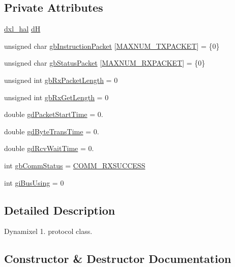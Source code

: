 \subsection*{Private Attributes}
\begin{DoxyCompactItemize}
\item 
\hyperlink{classdxl__hal}{dxl\+\_\+hal} \hyperlink{classdynamixel_ae003cc90ada6d7b70eaa4ea9d42d4deb}{d\+H}
\item 
unsigned char \hyperlink{classdynamixel_afd94dcf01b8e96298727776e222de722}{gb\+Instruction\+Packet} \mbox{[}\hyperlink{dxl__hal_8h_ad753363487043da5d9fdd3fd1071f59e}{M\+A\+X\+N\+U\+M\+\_\+\+T\+X\+P\+A\+C\+K\+E\+T}\mbox{]} = \{0\}
\item 
unsigned char \hyperlink{classdynamixel_aa57c86d3bbbeaf5c9d4f6bd00376b04f}{gb\+Status\+Packet} \mbox{[}\hyperlink{dxl__hal_8h_a37d5ce8f0a9ee058fa9674502c6a8b3a}{M\+A\+X\+N\+U\+M\+\_\+\+R\+X\+P\+A\+C\+K\+E\+T}\mbox{]} = \{0\}
\item 
unsigned int \hyperlink{classdynamixel_a333686e1b5903d16c41df8172b6bd5a8}{gb\+Rx\+Packet\+Length} = 0
\item 
unsigned int \hyperlink{classdynamixel_a9d590ce24791d111c2db9b66be1e046d}{gb\+Rx\+Get\+Length} = 0
\item 
double \hyperlink{classdynamixel_a6c6314fb7070e6fd361e57c5de17e0ec}{gd\+Packet\+Start\+Time} = 0.
\item 
double \hyperlink{classdynamixel_a2173f25c6299da7ddb37ba3d2bf1f738}{gd\+Byte\+Trans\+Time} = 0.
\item 
double \hyperlink{classdynamixel_a9f47887864517d74955a2bc787ae4456}{gd\+Rcv\+Wait\+Time} = 0.
\item 
int \hyperlink{classdynamixel_a5b603f6bed7ccc595f1f50bd6a6ebbfc}{gb\+Comm\+Status} = \hyperlink{dynamixel_8h_a171328d9f298535c18d079f65e631434}{C\+O\+M\+M\+\_\+\+R\+X\+S\+U\+C\+C\+E\+S\+S}
\item 
int \hyperlink{classdynamixel_ad10e0e49f5fef04bf789a89c14cc470a}{gi\+Bus\+Using} = 0
\end{DoxyCompactItemize}


\subsection{Detailed Description}
Dynamixel 1. protocol class. 

\subsection{Constructor \& Destructor Documentation}
\hypertarget{classdynamixel_a7aa668a213db6a41bede8e08a6fec830}{}

